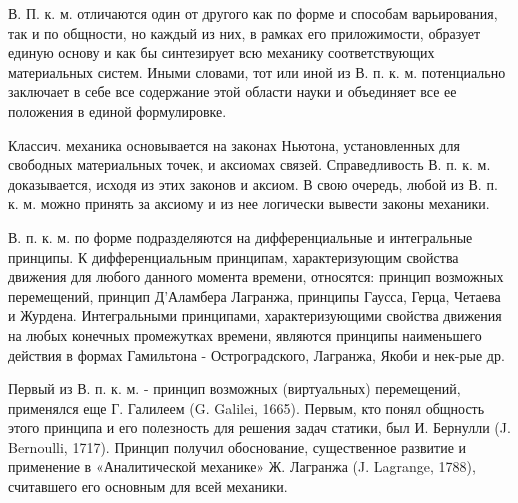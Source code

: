 \documentclass[10pt]{article}
\begin{document}
В. П. к. м. отличаются один от другого как по форме и способам варьирования, так и по общности, но каждый из них, в рамках его приложимости, образует единую основу и как бы синтезирует всю механику соответствующих материальных систем. Иными словами, тот или иной из В. п. к. м. потенциально заключает в себе все содержание этой области науки и объединяет все ее положения в единой формулировке.



Классич. механика основывается на законах Ньютона, установленных для свободных материальных точек, и аксиомах связей. Справедливость В. п. к. м. доказывается, исходя из этих законов и аксиом. В свою очередь, любой из В. п. к. м. можно принять за аксиому и из нее логически вывести законы механики.



В. п. к. м. по форме подразделяются на дифференциальные и интегральные принципы. К дифференциальным принципам, характеризующим свойства движения для любого данного момента времени, относятся: принцип возможных перемещений, принцип Д'Аламбера Лагранжа, принципы Гаусса, Герца, Четаева и Журдена. Интегральными принципами, характеризующими свойства движения на любых конечных промежутках времени, являются принципы наименьшего действия в формах Гамильтона - Остроградского, Лагранжа, Якоби и нек-рые др.



Первый из В. п. к. м. - принцип возможных (виртуальных) перемещений, применялся еще Г. Галилеем (G. Galilei, 1665). Первым, кто понял общность этого принципа и его полезность для решения задач статики, был И. Бернулли (J. Bernoulli, 1717). Принцип получил обоснование, существенное развитие и применение в «Аналитической механике» Ж. Лагранжа (J. Lagrange, 1788), считавшего его основным для всей механики.
\end{document}
